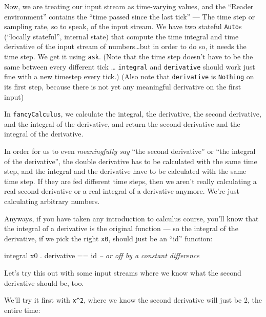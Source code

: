 \documentclass[]{article}
\newenvironment{Shaded}{}{}
\newcommand{\CommentTok}[1]{\textcolor[rgb]{0.38,0.63,0.69}{\textit{{#1}}}}
\newcommand{\FunctionTok}[1]{\textcolor[rgb]{0.02,0.16,0.49}{{#1}}}
\newcommand{\NormalTok}[1]{{#1}}
\begin{document}
Now, we are treating our input stream as time-varying values, and the
``Reader environment'' contains the ``time passed since the last tick''
--- The time step or sampling rate, so to speak, of the input stream. We
have two stateful \texttt{Auto}s (``locally stateful'', internal state)
that compute the time integral and time derivative of the input stream
of numbers\ldots{}but in order to do so, it needs the time step. We get
it using \texttt{ask}. (Note that the time step doesn't have to be the
same between every different tick \ldots{} \texttt{integral} and
\texttt{derivative} should work just fine with a new timestep every
tick.) (Also note that \texttt{derivative} is \texttt{Nothing} on its
first step, because there is not yet any meaningful derivative on the
first input)

In \texttt{fancyCalculus}, we calculate the integral, the derivative,
the second derivative, and the integral of the derivative, and return
the second derivative and the integral of the derivative.

In order for us to even \emph{meaningfully say} ``the second
derivative'' or ``the integral of the derivative'', the double
derivative has to be calculated with the same time step, and the
integral and the derivative have to be calculated with the same time
step. If they are fed different time steps, then we aren't really
calculating a real second derivative or a real integral of a derivative
anymore. We're just calculating arbitrary numbers.

Anyways, if you have taken any introduction to calculus course, you'll
know that the integral of a derivative is the original function --- so
the integral of the derivative, if we pick the right \texttt{x0}, should
just be an ``id'' function:

\begin{Shaded}
\begin{Highlighting}[]
\NormalTok{integral x0 }\FunctionTok{.} \NormalTok{derivative }\FunctionTok{==} \NormalTok{id      }\CommentTok{-- or off by a constant difference}
\end{Highlighting}
\end{Shaded}

Let's try this out with some input streams where we know what the second
derivative should be, too.

We'll try it first with \texttt{x\^{}2}, where we know the second
derivative will just be 2, the entire time:
\end{document}
